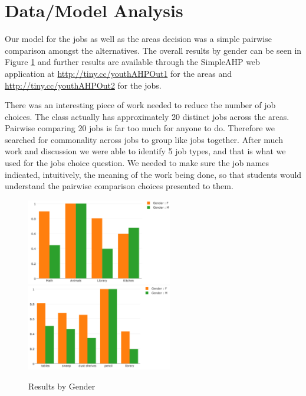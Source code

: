 \documentclass[11pt]{article}
\begin{document}

\section{Data/Model Analysis}
Our model for the jobs as well as the areas decision was a simple pairwise comparison
amongst the alternatives.  The overall results by gender can be seen in Figure \ref{fig1}
and further results are available through the SimpleAHP web application
at \url{http://tiny.cc/youthAHPOut1} for the areas and
\url{http://tiny.cc/youthAHPOut2} for the jobs.

There was an interesting piece of work needed to reduce the number of job choices.
The class actually has approximately 20 distinct jobs across the areas.  Pairwise
comparing 20 jobs is far too much for anyone to do.  Therefore we searched for
commonality across jobs to group like jobs together.  After much work and discussion
we were able to identify 5 job types, and that is what we used for the jobs
choice question.  We needed to make sure the job names indicated, intuitively, the
meaning of the work being done, so that students would understand the pairwise
comparison choices presented to them.
\begin{figure}
\caption{Results by Gender}
\includegraphics[width=2.5in]{AreasByGender}
\includegraphics[width=2.5in]{JobsByGender}
\label{fig1}	
\end{figure}
\end{document}
